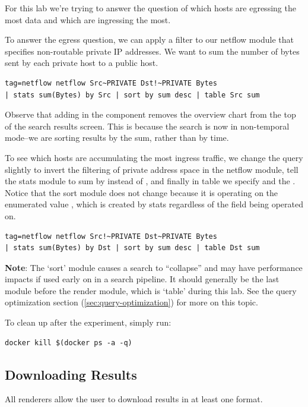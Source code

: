 For this lab we're trying to answer the question of which hosts are
egressing the most data and which are ingressing the most.

To answer the egress question, we can apply a filter to our netflow
module that specifies non-routable private IP addresses. We want to sum
the number of bytes sent by each private host to a public host.

\begin{Verbatim}[breaklines=true]
tag=netflow netflow Src~PRIVATE Dst!~PRIVATE Bytes
| stats sum(Bytes) by Src | sort by sum desc | table Src sum
\end{Verbatim}

Observe that adding in the  component removes the
overview chart from the top of the search results screen. This is
because the search is now in non-temporal mode--we are sorting results by
the sum, rather than by time.

To see which hosts are accumulating the most ingress traffic, we change
the query slightly to invert the filtering of private address space in
the netflow module, tell the stats module to sum by  instead of ,
and finally in table we specify  and the . Notice that the sort
module does not change because it is operating on the enumerated value
, which is created by stats regardless of the field being operated
on.

\begin{Verbatim}[breaklines=true]
tag=netflow netflow Src!~PRIVATE Dst~PRIVATE Bytes
| stats sum(Bytes) by Dst | sort by sum desc | table Dst sum
\end{Verbatim}

\textbf{Note}: The `sort' module causes a search to ``collapse'' and may have
performance impacts if used early on in a search pipeline. It should
generally be the last module before the render module, which is `table'
during this lab. See the query optimization section (\ref{sec:query-optimization}) for more on this topic.

To clean up after the experiment, simply run:

\begin{Verbatim}[breaklines=true]
docker kill $(docker ps -a -q)
\end{Verbatim}


\subsection{Downloading Results}
All renderers allow the user to download results in at least one
format.

